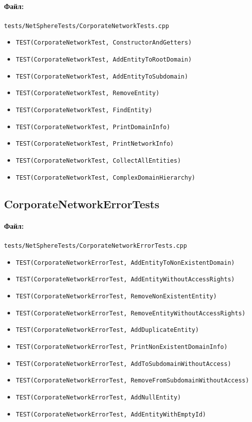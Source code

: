 \documentclass[14pt,a4paper]{extarticle}
\begin{document}
\paragraph{Файл:} \texttt{tests/NetSphereTests/CorporateNetworkTests.cpp}
\begin{itemize}
  \item \texttt{TEST(CorporateNetworkTest, ConstructorAndGetters)}
  \item \texttt{TEST(CorporateNetworkTest, AddEntityToRootDomain)}
  \item \texttt{TEST(CorporateNetworkTest, AddEntityToSubdomain)}
  \item \texttt{TEST(CorporateNetworkTest, RemoveEntity)}
  \item \texttt{TEST(CorporateNetworkTest, FindEntity)}
  \item \texttt{TEST(CorporateNetworkTest, PrintDomainInfo)}
  \item \texttt{TEST(CorporateNetworkTest, PrintNetworkInfo)}
  \item \texttt{TEST(CorporateNetworkTest, CollectAllEntities)}
  \item \texttt{TEST(CorporateNetworkTest, ComplexDomainHierarchy)}
\end{itemize}

\subsection{CorporateNetworkErrorTests}
\paragraph{Файл:} \texttt{tests/NetSphereTests/CorporateNetworkErrorTests.cpp}
\begin{itemize}
  \item \texttt{TEST(CorporateNetworkErrorTest, AddEntityToNonExistentDomain)}
  \item \texttt{TEST(CorporateNetworkErrorTest, AddEntityWithoutAccessRights)}
  \item \texttt{TEST(CorporateNetworkErrorTest, RemoveNonExistentEntity)}
  \item \texttt{TEST(CorporateNetworkErrorTest, RemoveEntityWithoutAccessRights)}
  \item \texttt{TEST(CorporateNetworkErrorTest, AddDuplicateEntity)}
  \item \texttt{TEST(CorporateNetworkErrorTest, PrintNonExistentDomainInfo)}
  \item \texttt{TEST(CorporateNetworkErrorTest, AddToSubdomainWithoutAccess)}
  \item \texttt{TEST(CorporateNetworkErrorTest, RemoveFromSubdomainWithoutAccess)}
  \item \texttt{TEST(CorporateNetworkErrorTest, AddNullEntity)}
  \item \texttt{TEST(CorporateNetworkErrorTest, AddEntityWithEmptyId)}
\end{itemize}
\end{document}
